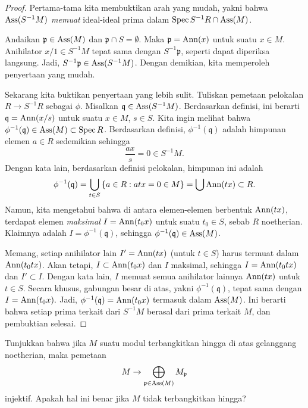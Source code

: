 \begin{proof} 
Pertama-tama kita membuktikan arah yang mudah, yakni bahwa $\operatorname{Ass}(S^{-1}M)$
\emph{memuat} ideal-ideal prima dalam $\operatorname{Spec} S^{-1}R \cap \operatorname{Ass}(M)$. 

Andaikan $\mathfrak{p} \in \operatorname{Ass}(M)$ dan
$\mathfrak{p} \cap S = \emptyset$. Maka $\mathfrak{p} = \operatorname{Ann}(x)$ untuk suatu $x
\in M$. Anihilator $x/1 \in S^{-1}M$ tepat sama dengan $S^{-1}\mathfrak{p}$, seperti dapat
diperiksa langsung. Jadi, $S^{-1}\mathfrak{p} \in \operatorname{Ass}(S^{-1}M)$.
Dengan demikian, kita memperoleh penyertaan yang mudah.

Sekarang kita buktikan penyertaan yang lebih sulit.  
Tuliskan pemetaan pelokalan $R \to S^{-1}R  $ sebagai $\phi$.
Misalkan $\mathfrak{q} \in \operatorname{Ass}(S^{-1}M)$. Berdasarkan definisi, ini berarti $\mathfrak{q} =
\operatorname{Ann}(x/s)$ untuk suatu $x \in M$, $s \in S$. Kita ingin melihat bahwa
$\phi^{-1}(\mathfrak{q}) \in \operatorname{Ass}(M) \subset \operatorname{Spec} R$.
Berdasarkan definisi, $\phi^{-1}(\mathfrak{q})$ adalah himpunan elemen $a \in R$ sedemikian sehingga
\[ \frac{ax}{s} = 0 \in S^{-1}M . \]
Dengan kata lain, berdasarkan definisi pelokalan, himpunan ini adalah 
\[  \phi^{-1}(\mathfrak{q}) = \bigcup_{t \in S} \left\{a \in R: atx = 0 \in M\right\} = \bigcup \operatorname{Ann}(tx)
\subset R.\]
Namun, kita mengetahui bahwa di antara elemen-elemen berbentuk $\operatorname{Ann}(tx)$, terdapat
elemen \emph{maksimal} $I=\operatorname{Ann}(t_0 x)$ untuk suatu $t_0 \in S$, sebab $R$
noetherian. Klaimnya adalah $I = \phi^{-1}(\mathfrak{q})$, sehingga
$\phi^{-1}(\mathfrak{q}) \in \operatorname{Ass}(M)$.

Memang, setiap anihilator lain $I' = \operatorname{Ann}(tx)$ (untuk $t \in S$) harus termuat dalam $\operatorname{Ann}(t_0 t x)$. Akan tetapi, 
\( I \subset \operatorname{Ann}(t_0 x)  \)
dan $I$ maksimal, sehingga $I = \operatorname{Ann}(t_0 t x)$ dan
\( I' \subset I.  \) Dengan kata lain, $I$ memuat semua anihilator lainnya
$\operatorname{Ann}(tx)$ untuk $t \in S$.
Secara khusus, gabungan besar di atas, yakni $\phi^{-1}(\mathfrak{q})$, tepat sama dengan
\( I = \operatorname{Ann}(t_0 x).  \)
Jadi, $\phi^{-1}(\mathfrak{q}) = \operatorname{Ann}(t_0x)$ termasuk dalam $\operatorname{Ass}(M)$.
Ini berarti bahwa setiap prima terkait
dari $S^{-1}M$ berasal dari prima terkait $M$, dan pembuktian selesai.
\end{proof} 



\begin{exercise} 
Tunjukkan bahwa jika $M$ suatu modul terbangkitkan hingga di atas gelanggang noetherian, maka
pemetaan
\[ M \to \bigoplus_{\mathfrak{p} \in \operatorname{Ass}(M)} M_{\mathfrak{p}}  \]
injektif. Apakah hal ini benar jika $M$ tidak terbangkitkan hingga?
\end{exercise} 

